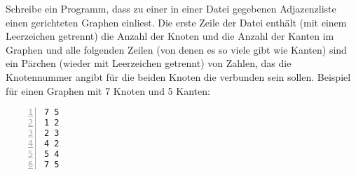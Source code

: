 \begin{aufg}
Schreibe ein Programm, dass zu einer in einer Datei gegebenen Adjazenzliste einen gerichteten Graphen einliest. Die erste Zeile der Datei enthält (mit einem Leerzeichen getrennt) die Anzahl der Knoten und die Anzahl der Kanten im Graphen und alle folgenden Zeilen (von denen es so viele gibt wie Kanten) sind ein Pärchen (wieder mit Leerzeichen getrennt) von Zahlen, das die Knotennummer angibt für die beiden Knoten die verbunden sein sollen. Beispiel für einen Graphen mit 7 Knoten und 5 Kanten:
\begin{codelisting}
\begin{lstlisting}[numbers=left,numberstyle=\tiny,frame=tlrb]
7 5
1 2
2 3
4 2
5 4
7 5
\end{lstlisting}
\end{codelisting}
\end{aufg}